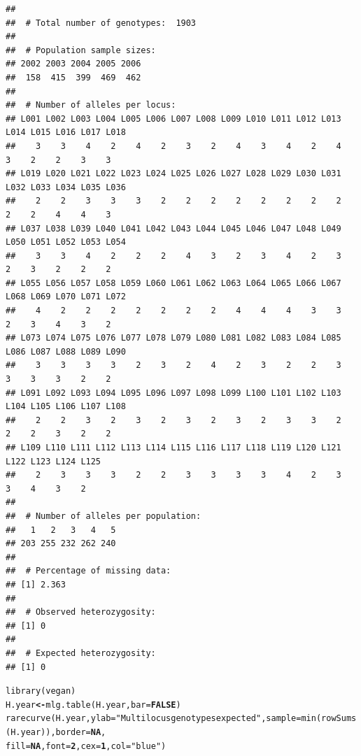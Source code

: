 \documentclass[letterpaper]{article}\usepackage[]{graphicx}\usepackage[]{color}
\makeatletter
\newcommand{\hlnum}[1]{\textcolor[rgb]{0.502,0,0.502}{\textbf{#1}}}%
\newcommand{\hlstr}[1]{\textcolor[rgb]{0.651,0.522,0}{#1}}%
\newcommand{\hlstd}[1]{\textcolor[rgb]{0,0,0}{#1}}%
\newcommand{\hlkwb}[1]{\textcolor[rgb]{0.502,0.502,0.753}{\textbf{#1}}}%
\newcommand{\hlkwc}[1]{\textcolor[rgb]{0,0.502,0.753}{#1}}%
\newcommand{\hlkwd}[1]{\textcolor[rgb]{0,0.267,0.4}{#1}}%
\newenvironment{kframe}{%
 \def\at@end@of@kframe{}%
 \ifinner\ifhmode%
  \def\at@end@of@kframe{\end{minipage}}%
  \begin{minipage}{\columnwidth}%
 \fi\fi%
 \def\FrameCommand##1{\hskip\@totalleftmargin \hskip-\fboxsep
 \colorbox{shadecolor}{##1}\hskip-\fboxsep
     \hskip-\linewidth \hskip-\@totalleftmargin \hskip\columnwidth}%
 \MakeFramed {\advance\hsize-\width
   \@totalleftmargin\z@ \linewidth\hsize
   \@setminipage}}%
 {\par\unskip\endMakeFramed%
 \at@end@of@kframe}
\newenvironment{knitrout}{}{} %
\makeatother
\begin{document}
\begin{knitrout}\footnotesize
{}\color{fgcolor}\begin{kframe}
\begin{verbatim}
## 
##  # Total number of genotypes:  1903
## 
##  # Population sample sizes:  
## 2002 2003 2004 2005 2006 
##  158  415  399  469  462 
## 
##  # Number of alleles per locus:  
## L001 L002 L003 L004 L005 L006 L007 L008 L009 L010 L011 L012 L013 L014 L015 L016 L017 L018 
##    3    3    4    2    4    2    3    2    4    3    4    2    4    3    2    2    3    3 
## L019 L020 L021 L022 L023 L024 L025 L026 L027 L028 L029 L030 L031 L032 L033 L034 L035 L036 
##    2    2    3    3    3    2    2    2    2    2    2    2    2    2    2    4    4    3 
## L037 L038 L039 L040 L041 L042 L043 L044 L045 L046 L047 L048 L049 L050 L051 L052 L053 L054 
##    3    3    4    2    2    2    4    3    2    3    4    2    3    2    3    2    2    2 
## L055 L056 L057 L058 L059 L060 L061 L062 L063 L064 L065 L066 L067 L068 L069 L070 L071 L072 
##    4    2    2    2    2    2    2    2    4    4    4    3    3    2    3    4    3    2 
## L073 L074 L075 L076 L077 L078 L079 L080 L081 L082 L083 L084 L085 L086 L087 L088 L089 L090 
##    3    3    3    3    2    3    2    4    2    3    2    2    3    3    3    3    2    2 
## L091 L092 L093 L094 L095 L096 L097 L098 L099 L100 L101 L102 L103 L104 L105 L106 L107 L108 
##    2    2    3    2    3    2    3    2    3    2    3    3    2    2    2    3    2    2 
## L109 L110 L111 L112 L113 L114 L115 L116 L117 L118 L119 L120 L121 L122 L123 L124 L125 
##    2    3    3    3    2    2    3    3    3    3    4    2    3    3    4    3    2 
## 
##  # Number of alleles per population:  
##   1   2   3   4   5 
## 203 255 232 262 240 
## 
##  # Percentage of missing data:  
## [1] 2.363
## 
##  # Observed heterozygosity:  
## [1] 0
## 
##  # Expected heterozygosity:  
## [1] 0
\end{verbatim}
\end{kframe}
\end{knitrout}

\begin{knitrout}\footnotesize
{}\color{fgcolor}\begin{kframe}
\begin{alltt}
\hlkwd{library}\hlstd{(vegan)}
\hlstd{H.year} \hlkwb{<-} \hlkwd{mlg.table}\hlstd{(H.year,} \hlkwc{bar} \hlstd{=} \hlnum{FALSE}\hlstd{)}
\hlkwd{rarecurve}\hlstd{(H.year,} \hlkwc{ylab} \hlstd{=} \hlstr{"Multilocus genotypes expected"}\hlstd{,} \hlkwc{sample} \hlstd{=} \hlkwd{min}\hlstd{(}\hlkwd{rowSums}\hlstd{(H.year)),} \hlkwc{border} \hlstd{=} \hlnum{NA}\hlstd{,}
    \hlkwc{fill} \hlstd{=} \hlnum{NA}\hlstd{,} \hlkwc{font} \hlstd{=} \hlnum{2}\hlstd{,} \hlkwc{cex} \hlstd{=} \hlnum{1}\hlstd{,} \hlkwc{col} \hlstd{=} \hlstr{"blue"}\hlstd{)}
\end{alltt}
\end{kframe}
\end{knitrout}
\end{document}
